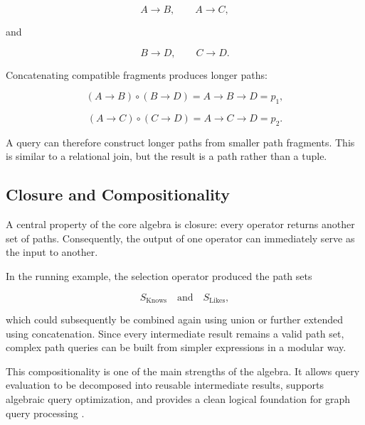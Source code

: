 \[
A\rightarrow B,
\qquad
A\rightarrow C,
\]

and

\[
B\rightarrow D,
\qquad
C\rightarrow D.
\]

Concatenating compatible fragments produces longer paths:

\[
(A\rightarrow B)\circ(B\rightarrow D)
=
A\rightarrow B\rightarrow D
=
p_1,
\]

\[
(A\rightarrow C)\circ(C\rightarrow D)
=
A\rightarrow C\rightarrow D
=
p_2.
\]

A query can therefore construct longer paths from smaller path fragments. This is similar to a relational join, but the result is a path rather than a tuple.

\subsection{Closure and Compositionality}
A central property of the core algebra is closure: every operator returns another set of paths. Consequently, the output of one operator can immediately serve as the input to another.

In the running example, the selection operator produced the path sets

\[
S_{\text{Knows}}
\quad\text{and}\quad
S_{\text{Likes}},
\]

which could subsequently be combined again using union or further extended using concatenation. Since every intermediate result remains a valid path set, complex path queries can be built from simpler expressions in a modular way.

This compositionality is one of the main strengths of the algebra. It allows query evaluation to be decomposed into reusable intermediate results, supports algebraic query optimization, and provides a clean logical foundation for graph query processing \cite{angles2024path}.
